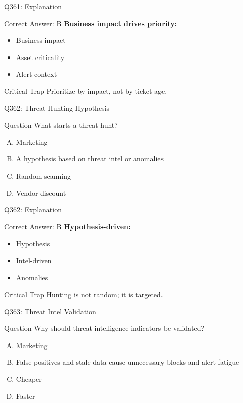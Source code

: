 \documentclass{beamer}
\begin{document}
	\begin{frame}{Q361: Explanation}
		\begin{block}{Correct Answer: B}
			\textbf{Business impact drives priority:}
			\begin{itemize}
				\item Business impact
				\item Asset criticality
				\item Alert context
			\end{itemize}
		\end{block}
		\begin{alertblock}{Critical Trap}
			Prioritize by impact, not by ticket age.
		\end{alertblock}
	\end{frame}
	
	\begin{frame}{Q362: Threat Hunting Hypothesis}
		\begin{block}{Question}
			What starts a threat hunt?
		\end{block}
		\begin{enumerate}[(A)]
			\item Marketing
			\item A hypothesis based on threat intel or anomalies
			\item Random scanning
			\item Vendor discount
		\end{enumerate}
	\end{frame}
	
	\begin{frame}{Q362: Explanation}
		\begin{block}{Correct Answer: B}
			\textbf{Hypothesis-driven:}
			\begin{itemize}
				\item Hypothesis
				\item Intel-driven
				\item Anomalies
			\end{itemize}
		\end{block}
		\begin{alertblock}{Critical Trap}
			Hunting is not random; it is targeted.
		\end{alertblock}
	\end{frame}
	
	\begin{frame}{Q363: Threat Intel Validation}
		\begin{block}{Question}
			Why should threat intelligence indicators be validated?
		\end{block}
		\begin{enumerate}[(A)]
			\item Marketing
			\item False positives and stale data cause unnecessary blocks and alert fatigue
			\item Cheaper
			\item Faster
		\end{enumerate}
	\end{frame}
	
\end{document}
